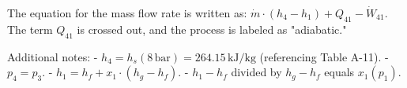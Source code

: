 The equation for the mass flow rate is written as:  
\( \dot{m} \cdot (h_4 - h_1) + Q_{41} - \dot{W}_{41} \).  
The term \( Q_{41} \) is crossed out, and the process is labeled as "adiabatic."  

Additional notes:  
- \( h_4 = h_s(8 \, \text{bar}) = 264.15 \, \text{kJ/kg} \) (referencing Table A-11).  
- \( p_4 = p_3 \).  
- \( h_1 = h_f + x_1 \cdot (h_g - h_f) \).  
- \( h_1 - h_f \) divided by \( h_g - h_f \) equals \( x_1(p_1) \).